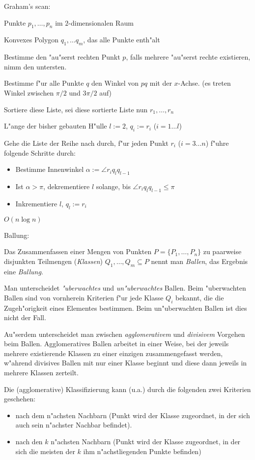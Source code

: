 \algorithm Graham's scan:{
  \given Punkte $p_1,\ldots,p_n$ im $2$-dimensionalen Raum
  
  \aim Konvexes Polygon $q_1,\ldots q_m$, das alle Punkte enth"alt
  
  \begin{proc}
    \item Bestimme den "au"serst rechten Punkt $p$, falls mehrere "au"serst
      rechte existieren, nimm den untersten.
    \item Bestimme f"ur alle Punkte $q$ den Winkel von $pq$ mit der $x$-Achse.
      (es treten Winkel zwischen $\pi/2$ und $3\pi/2$ auf)
    \item Sortiere diese Liste, sei diese sortierte Liste nun $r_1,\ldots,r_n$
    \item L"ange der  bisher gebauten H"ulle $l:=2$, $q_i:=r_i$ ($i=1\ldots l$)
    \item Gehe die Liste der Reihe nach durch, f"ur jeden Punkt $r_i$ 
      ($i=3\ldots n$) f"uhre folgende Schritte durch:
      \begin{itemize}
        \item Bestimme Innenwinkel $\alpha:=\angle r_i q_l q_{l-1}$
        \item Ist $\alpha > \pi$, dekrementiere $l$ solange, bis 
          $\angle r_i q_l q_{l-1}\le \pi$
        \item Inkrementiere $l$, $q_l:=r_i$
      \end{itemize}
  \end{proc}

  \cpx $O(n \log n)$
}
 Ballung:{
  Das Zusammenfassen einer Mengen von Punkten $P=\{P_1,\ldots,P_n\}$ zu
  paarweise disjunkten Teilmengen (\textit{Klassen}) 
  $Q_1,\ldots,Q_m\subseteq P$ nennt man
  \textit{Ballen}, das Ergebnis eine \textit{Ballung}.
  
  Man unterscheidet \textit{"uberwachtes} und \textit{un"uberwachtes} Ballen.
  Beim "uberwachten Ballen sind von vornherein Kriterien f"ur jede Klasse 
  $Q_i$ bekannt, die die Zugeh"origkeit eines Elementes bestimmen. 
  Beim un"uberwachten Ballen ist dies nicht der Fall.
  
  Au"serdem unterscheidet man zwischen \textit{agglomerativem} und 
  \textit{divisivem} Vorgehen beim Ballen. 
  Agglomeratives Ballen arbeitet in einer Weise, bei der jeweils mehrere 
  existierende Klassen zu einer einzigen zusammengefasst werden, w"ahrend
  divisives Ballen mit nur einer Klasse beginnt und diese dann jeweils
  in mehrere Klassen zerteilt.
  
  Die (agglomerative) Klassifizierung kann (u.a.) durch die folgenden zwei 
  Kriterien geschehen:
  \begin{itemize}
    \item nach dem n"achsten Nachbarn (Punkt wird der Klasse zugeordnet,
      in der sich auch sein n"achster Nachbar befindet).
    \item nach den $k$ n"achsten Nachbarn (Punkt wird der Klasse zugeordnet,
      in der sich die meisten der $k$ ihm n"achstliegenden Punkte befinden)
  \end{itemize}
}

